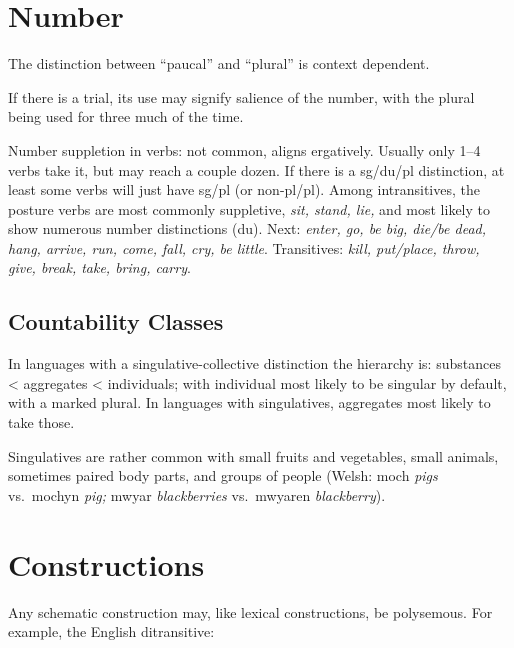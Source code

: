 \documentclass[11pt]{article}
\begin{document}
{\section{Number}
The distinction between ``paucal'' and ``plural'' is context
dependent. 

If there is a trial, its use may signify salience of the number, with
the plural being used for three much of the time.

Number suppletion in verbs: not common, aligns ergatively.  Usually
only 1--4 verbs take it, but may reach a couple dozen.  If there is a
sg/du/pl distinction, at least some verbs will just have sg/pl (or
non-pl/pl).  Among intransitives, the posture verbs are most commonly
suppletive, \textit{sit, stand, lie,} and most likely to show numerous
number distinctions (du).  Next: \textit{enter, go, be big, die/be
  dead, hang, arrive, run, come, fall, cry, be little}.  Transitives:
\textit{kill, put/place, throw, give, break, take, bring, carry}.


\subsection{Countability Classes}  In languages with a
singulative-collective distinction the hierarchy is: substances <
aggregates < individuals; with individual most likely to be singular
by default, with a marked plural.  In languages with singulatives,
aggregates most likely to take those.

Singulatives are rather common with small fruits and vegetables, small
animals, sometimes paired body parts, and groups of people (Welsh:
moch \textit{pigs} vs.\ mochyn \textit{pig;} mwyar
\textit{blackberries} vs.\ mwyaren \textit{blackberry}).



\section{Constructions}
Any schematic construction may, like lexical constructions, be
polysemous.  For example, the English ditransitive:

}
\end{document}
